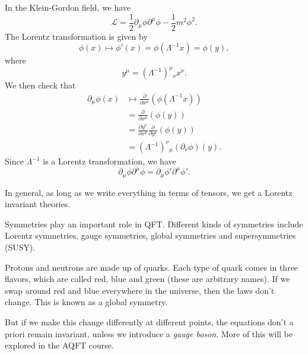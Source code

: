 \documentclass[a4paper]{article}
\begin{document}
\begin{eg}
  In the Klein-Gordon field, we have
  \[
    \mathcal{L} = \frac{1}{2} \partial_\mu \phi \partial^\mu \phi - \frac{1}{2}m^2 \phi^2.
  \]
  The Lorentz transformation is given by
  \[
    \phi(x) \mapsto \phi'(x) = \phi(\Lambda^{-1}x) = \phi(y),
  \]
  where
  \[
    y^\mu = (\Lambda^{-1})^\mu\!_\nu x^\nu.
  \]
  We then check that
  \begin{align*}
    \partial_\mu \phi(x) &\mapsto \frac{\partial}{\partial x^\mu}(\phi(\Lambda^{-1}x)) \\
    &= \frac{\partial}{\partial x^\mu} (\phi(y))\\
    &= \frac{\partial y^\nu}{\partial x^\mu} \frac{\partial}{\partial y^\nu} (\phi(y))\\
    &= (\Lambda^{-1})^\nu\!_\mu(\partial_\nu \phi)(y).
  \end{align*}
  Since $\Lambda^{-1}$ is a Lorentz transformation, we have
  \[
    \partial_\mu \phi \partial^\mu \phi = \partial_\mu \phi' \partial^\mu \phi'.
  \]
\end{eg}
In general, as long as we write everything in terms of tensors, we get a Lorentz invariant theories.

Symmetries play an important role in QFT. Different kinds of symmetries include Lorentz symmetries, gauge symmetries, global symmetries and supersymmetries (SUSY).

\begin{eg}
  Protons and neutrons are made up of quarks. Each type of quark comes in three flavors, which are called red, blue and green (these are arbitrary names). If we swap around red and blue everywhere in the universe, then the laws don't change. This is known as a global symmetry.

  But if we make this change differently at different points, the equations don't a priori remain invariant, unless we introduce a \emph{gauge boson}. More of this will be explored in the AQFT course.
\end{eg}
\end{document}
